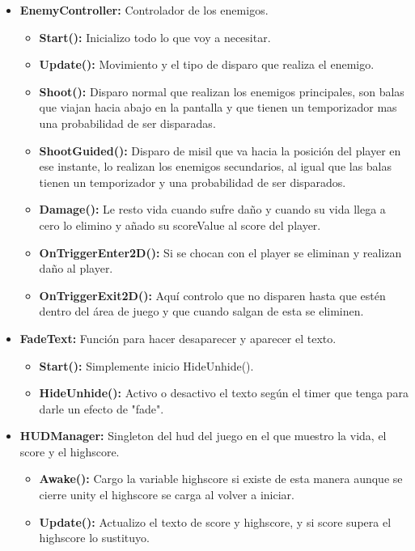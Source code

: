 \documentclass[titlepage, 4apaper]{article}
\begin{document}
\begin{itemize}
  \item \textbf{EnemyController:} Controlador de los enemigos.
	\begin{itemize}
    \item \textbf{Start():} Inicializo todo lo que voy a necesitar.
    \item \textbf{Update():} Movimiento y el tipo de disparo que realiza el enemigo.
    \item \textbf{Shoot():} Disparo normal que realizan los enemigos principales, son balas que viajan hacia abajo en la pantalla y que tienen un temporizador mas una probabilidad de ser disparadas.
    \item \textbf{ShootGuided():} Disparo de misil que va hacia la posición del player en ese instante, lo realizan los enemigos secundarios, al igual que las balas tienen un temporizador y una probabilidad de ser disparados.
    \item \textbf{Damage():} Le resto vida cuando sufre daño y cuando su vida llega a cero lo elimino y añado su scoreValue al score del player.
    \item \textbf{OnTriggerEnter2D():} Si se chocan con el player se eliminan y realizan daño al player.
    \item \textbf{OnTriggerExit2D():} Aquí controlo que no disparen hasta que estén dentro del área de juego y que cuando salgan de esta se eliminen.
  \end{itemize}

  \item \textbf{FadeText:} Función para hacer desaparecer y aparecer el texto.
	\begin{itemize}
    \item \textbf{Start():} Simplemente inicio HideUnhide().
    \item \textbf{HideUnhide():} Activo o desactivo el texto según el timer que tenga para darle un efecto de "fade".
  \end{itemize}

  \item \textbf{HUDManager:} Singleton del hud del juego en el que muestro la vida, el score y el highscore.
	\begin{itemize}
    \item \textbf{Awake():} Cargo la variable highscore si existe de esta manera aunque se cierre unity el highscore se carga al volver a iniciar.
    \item \textbf{Update():} Actualizo el texto de score y highscore, y si score supera el highscore lo sustituyo.
  \end{itemize}


\end{itemize}
\end{document}
